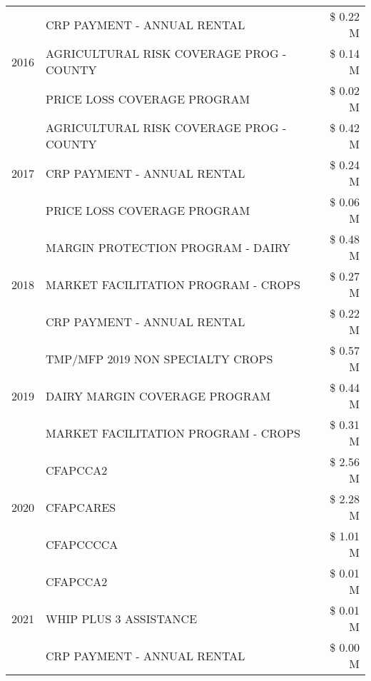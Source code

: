 \begin{tabular}{llr}
\cline{1-3}
\multirow[t]{3}{*}{2016} & CRP PAYMENT - ANNUAL RENTAL & \$ 0.22 M \\
 & AGRICULTURAL RISK COVERAGE PROG - COUNTY & \$ 0.14 M \\
 & PRICE LOSS COVERAGE PROGRAM & \$ 0.02 M \\
\cline{1-3}
\multirow[t]{3}{*}{2017} & AGRICULTURAL RISK COVERAGE PROG - COUNTY & \$ 0.42 M \\
 & CRP PAYMENT - ANNUAL RENTAL & \$ 0.24 M \\
 & PRICE LOSS COVERAGE PROGRAM & \$ 0.06 M \\
\cline{1-3}
\multirow[t]{3}{*}{2018} & MARGIN PROTECTION PROGRAM - DAIRY & \$ 0.48 M \\
 & MARKET FACILITATION PROGRAM - CROPS & \$ 0.27 M \\
 & CRP PAYMENT - ANNUAL RENTAL & \$ 0.22 M \\
\cline{1-3}
\multirow[t]{3}{*}{2019} & TMP/MFP 2019 NON SPECIALTY CROPS & \$ 0.57 M \\
 & DAIRY MARGIN COVERAGE PROGRAM & \$ 0.44 M \\
 & MARKET FACILITATION PROGRAM - CROPS & \$ 0.31 M \\
\cline{1-3}
\multirow[t]{3}{*}{2020} & CFAPCCA2 & \$ 2.56 M \\
 & CFAPCARES & \$ 2.28 M \\
 & CFAPCCCCA & \$ 1.01 M \\
\cline{1-3}
\multirow[t]{3}{*}{2021} & CFAPCCA2 & \$ 0.01 M \\
 & WHIP PLUS 3 ASSISTANCE & \$ 0.01 M \\
 & CRP PAYMENT - ANNUAL RENTAL & \$ 0.00 M \\
\cline{1-3}
\bottomrule
\end{tabular}
